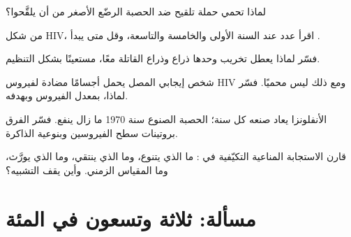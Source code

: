 \begin{exercise}[$\star\star$]\label{exo:g12:adaptive-immunity:10}
لماذا تحمي حملة تلقيح ضد الحصبة الرضّع الأصغر من أن يلقَّحوا؟
\end{exercise}

\begin{exercise}[$\star\star$]\label{exo:g12:adaptive-immunity:11}
من شكل HIV، اقرأ عدد  عند السنة الأولى
والخامسة والتاسعة، وقل متى يبدأ .
\end{exercise}

\begin{exercise}[$\star\star\star$]\label{exo:g12:adaptive-immunity:12}
فسّر لماذا يعطل تخريب  وحدها ذراع  وذراع  القاتلة معًا، مستعينًا بشكل التنظيم.
\end{exercise}

\begin{exercise}[$\star\star\star$]\label{exo:g12:adaptive-immunity:13}
شخص إيجابي المصل يحمل أجسامًا مضادة لفيروس HIV ومع ذلك ليس محميًا. فسّر
لماذا، بمعدل  الفيروس وبهدفه.
\end{exercise}

\begin{exercise}[$\star\star\star$]\label{exo:g12:adaptive-immunity:14}
 الأنفلونزا يعاد صنعه كل سنة؛  الحصبة الصنوع سنة 1970 ما زال
ينفع. فسّر الفرق  بروتينات سطح الفيروسين وبنوعية الذاكرة.
\end{exercise}

\begin{exercise}[$\star\star\star$]\label{exo:g12:adaptive-immunity:15}
قارن الاستجابة المناعية التكيّفية  في : ما الذي
يتنوع، وما الذي ينتقي، وما الذي يورَّث، وما المقياس الزمني. وأين يقف
التشبيه؟
\end{exercise}

\section{مسألة: ثلاثة وتسعون في المئة}

